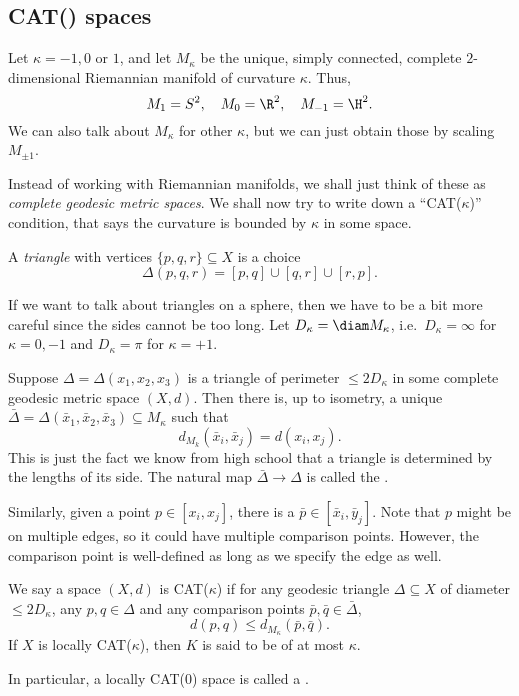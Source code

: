 \documentclass[a4paper]{article}
\begin{document}
\subsection{CAT() spaces}
Let $\kappa = -1, 0$ or $1$, and let $M_\kappa$ be the unique, simply connected, complete $2$-dimensional Riemannian manifold of curvature $\kappa$. Thus,
\[
  M_1 = S^2,\quad M_0 = \R^2,\quad M_{-1} = \H^2.
\]
We can also talk about $M_\kappa$ for other $\kappa$, but we can just obtain those by scaling $M_{\pm 1}$.

Instead of working with Riemannian manifolds, we shall just think of these as \emph{complete geodesic metric spaces}. We shall now try to write down a ``CAT($\kappa$)'' condition, that says the curvature is bounded by $\kappa$ in some space.

\begin{defi}[Triangle]
  A \emph{triangle} with vertices $\{p, q, r\} \subseteq X$ is a choice
  \[
    \Delta(p, q, r) = [p, q] \cup [q, r] \cup [r, p].
  \]
\end{defi}
If we want to talk about triangles on a sphere, then we have to be a bit more careful since the sides cannot be too long. Let $D_\kappa = \diam M_\kappa$, i.e.\ $D_\kappa = \infty$ for $\kappa = 0, -1$ and $D_\kappa = \pi$ for $\kappa = +1$.

Suppose $\Delta = \Delta(x_1, x_2, x_3)$ is a triangle of perimeter $\leq 2 D_\kappa$ in some complete geodesic metric space $(X, d)$. Then there is, up to isometry, a unique  $\bar{\Delta} = \Delta(\bar{x}_1, \bar{x}_2, \bar{x}_3) \subseteq M_\kappa$ such that
\[
  d_{M_k}(\bar{x}_i, \bar{x}_j) = d(x_i, x_j).
\]
This is just the fact we know from high school that a triangle is determined by the lengths of its side. The natural map $\bar{\Delta} \to \Delta$ is called the .

Similarly, given a point $p \in [x_i, x_j]$, there is a  $\bar{p} \in [\bar{x}_i, \bar{y}_j]$. Note that $p$ might be on multiple edges, so it could have multiple comparison points. However, the comparison point is well-defined as long as we specify the edge as well.

\begin{defi} %
  We say a space $(X, d)$ is CAT($\kappa$) if for any geodesic triangle $\Delta \subseteq X$ of diameter $\leq 2 D_\kappa$, any $p, q \in \Delta$ and any comparison points $\bar{p}, \bar{q} \in \bar{\Delta}$,
  \[
    d(p, q) \leq d_{M_\kappa} (\bar{p}, \bar{q}).
  \]
  If $X$ is locally CAT($\kappa$), then $K$ is said to be of  at most $\kappa$.

  In particular, a locally CAT(0) space is called a .
\end{defi}
\end{document}
